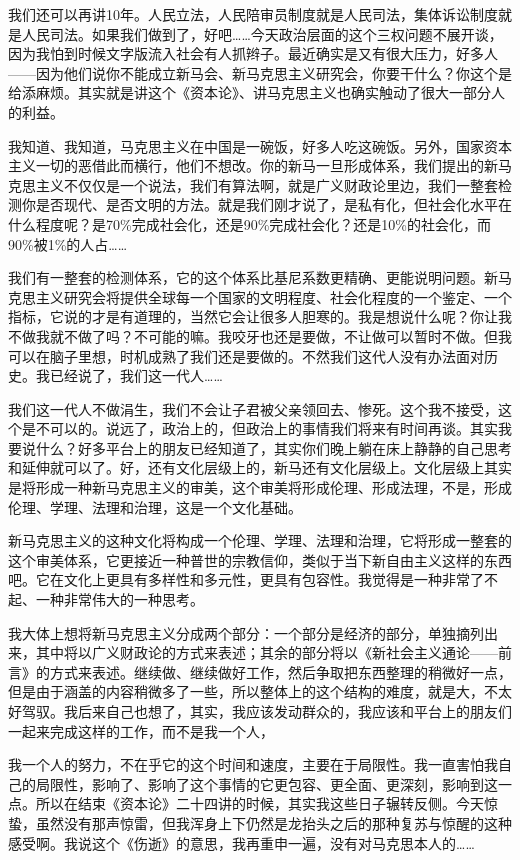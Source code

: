 \documentclass[UTF8, 12pt, a4paper]{ctexrep}
\begin{document}
我们还可以再讲10年。人民立法，人民陪审员制度就是人民司法，集体诉讼制度就是人民司法。如果我们做到了，好吧……今天政治层面的这个三权问题不展开谈，因为我怕到时候文字版流入社会有人抓辫子。最近确实是又有很大压力，好多人——因为他们说你不能成立新马会、新马克思主义研究会，你要干什么？你这个是给添麻烦。其实就是讲这个《资本论》、讲马克思主义也确实触动了很大一部分人的利益。

我知道、我知道，马克思主义在中国是一碗饭，好多人吃这碗饭。另外，国家资本主义一切的恶借此而横行，他们不想改。你的新马一旦形成体系，我们提出的新马克思主义不仅仅是一个说法，我们有算法啊，就是广义财政论里边，我们一整套检测你是否现代、是否文明的方法。就是我们刚才说了，是私有化，但社会化水平在什么程度呢？是70\%完成社会化，还是90\%完成社会化？还是10\%的社会化，而90\%被1\%的人占……

我们有一整套的检测体系，它的这个体系比基尼系数更精确、更能说明问题。新马克思主义研究会将提供全球每一个国家的文明程度、社会化程度的一个鉴定、一个指标，它说的才是有道理的，当然它会让很多人胆寒的。我是想说什么呢？你让我不做我就不做了吗？不可能的嘛。我咬牙也还是要做，不让做可以暂时不做。但我可以在脑子里想，时机成熟了我们还是要做的。不然我们这代人没有办法面对历史。我已经说了，我们这一代人……

我们这一代人不做涓生，我们不会让子君被父亲领回去、惨死。这个我不接受，这个是不可以的。说远了，政治上的，但政治上的事情我们将来有时间再谈。其实我要说什么？好多平台上的朋友已经知道了，其实你们晚上躺在床上静静的自己思考和延伸就可以了。好，还有文化层级上的，新马还有文化层级上。文化层级上其实是将形成一种新马克思主义的审美，这个审美将形成伦理、形成法理，不是，形成伦理、学理、法理和治理，这是一个文化基础。

新马克思主义的这种文化将构成一个伦理、学理、法理和治理，它将形成一整套的这个审美体系，它更接近一种普世的宗教信仰，类似于当下新自由主义这样的东西吧。它在文化上更具有多样性和多元性，更具有包容性。我觉得是一种非常了不起、一种非常伟大的一种思考。

我大体上想将新马克思主义分成两个部分：一个部分是经济的部分，单独摘列出来，其中将以广义财政论的方式来表述；其余的部分将以《新社会主义通论——前言》的方式来表述。继续做、继续做好工作，然后争取把东西整理的稍微好一点，但是由于涵盖的内容稍微多了一些，所以整体上的这个结构的难度，就是大，不太好驾驭。我后来自己也想了，其实，我应该发动群众的，我应该和平台上的朋友们一起来完成这样的工作，而不是我一个人，

我一个人的努力，不在乎它的这个时间和速度，主要在于局限性。我一直害怕我自己的局限性，影响了、影响了这个事情的它更包容、更全面、更深刻，影响到这一点。所以在结束《资本论》二十四讲的时候，其实我这些日子辗转反侧。今天惊蛰，虽然没有那声惊雷，但我浑身上下仍然是龙抬头之后的那种复苏与惊醒的这种感受啊。我说这个《伤逝》的意思，我再重申一遍，没有对马克思本人的……
\end{document}
